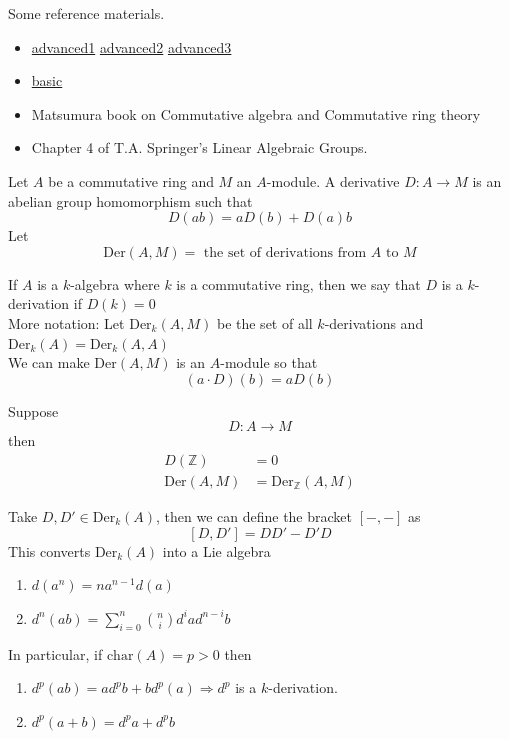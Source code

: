 \documentclass[oneside, 12pt]{scrbook}
\newcommand{\ZZ}{\mathbb Z}
\theoremstyle{theorem}
\begin{document}
Some reference materials. 
\begin{itemize}
\item \href{http://math.uchicago.edu/~amathew/chsmoothness.pdf}{advanced1} \href{http://therisingsea.org/notes/Section2.8-Differentials.pdf}{advanced2} \href{https://anagrams-seminar.github.io/hdr/kahler.pdf}{advanced3}
\item \href{http://people.math.sfu.ca/~kyeats/teaching/math800/MATH%20800%20-%20Final%20Project.pdf}{basic}
\item Matsumura book on Commutative algebra and Commutative ring theory
\item Chapter 4 of T.A. Springer's Linear Algebraic Groups.
\end{itemize}

Let $A$ be a commutative ring and $M$ an $A$-module. A derivative $D : A \rightarrow M$ is an abelian group homomorphism such that $$D(ab) = aD(b) + D(a)b$$
Let $$\mathrm{Der}(A,M) = \text{ the set of derivations from } A \text{ to } M$$

If $A$ is a $k$-algebra where $k$ is a commutative ring, then we say that $D$ is a $k$-derivation if $D(k)=0$ \\

More notation: Let $\mathrm{Der}_{k}(A,M)$ be the set of all $k$-derivations and $\mathrm{Der}_{k}(A) = \mathrm{Der}_{k}(A,A)$\\

We can make $\mathrm{Der}(A,M)$ is an $A$-module so that $$(a\cdot D)(b) = aD(b)$$

Suppose $$D: A \rightarrow M$$ then 
\begin{align*}
D(\ZZ) &= 0 \\
\mathrm{Der}(A,M) &= \mathrm{Der}_{\ZZ}(A,M)
\end{align*}

Take $D,D' \in \mathrm{Der}_{k}(A)$, then we can define the bracket $[-,-]$ as $$[D,D'] = DD' - D'D$$ This converts $\mathrm{Der}_{k}(A)$ into a Lie algebra 

\begin{remark}
\begin{enumerate}
\item $d(a^n) = na^{n-1}d(a)$
\item $d^{n}(ab) = \sum_{i=0}^{n} \binom{n}{i} d^{i} a d^{n-i} b$
\end{enumerate}
In particular, if $\mathrm{char}(A)=p > 0$ then 
\begin{enumerate}
\item $d^{p}(ab) = ad^{p}b + bd^{p}(a) \Rightarrow d^p$ is a $k$-derivation.
\item $d^{p}(a+b) = d^p a + d^p b$ 
\end{enumerate}
\end{remark}
\end{document}
